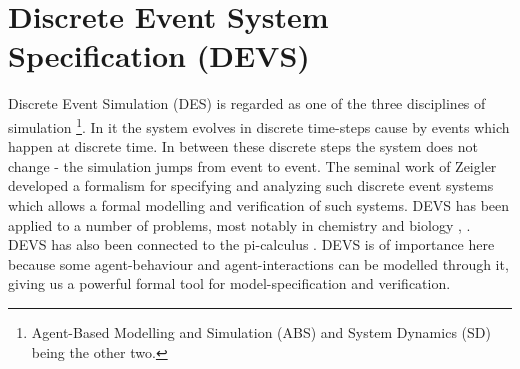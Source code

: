 \section{Discrete Event System Specification (DEVS)}
Discrete Event Simulation (DES) is regarded as one of the three disciplines of simulation \footnote{Agent-Based Modelling and Simulation (ABS) and System Dynamics (SD) being the other two.}. In it the system evolves in discrete time-steps cause by events which happen at discrete time. In between these discrete steps the system does not change - the simulation jumps from event to event. The seminal work of Zeigler \cite{zeigler_theory_2000} developed a formalism for specifying and analyzing such discrete event systems which allows a formal modelling and verification of such systems. DEVS has been applied to a number of problems, most notably in chemistry and biology \cite{ewald_discrete_2007}, \cite{uhrmacher_discrete_2005}. DEVS has also been connected to the pi-calculus \cite{wang_pi-calculus_2008}.
DEVS is of importance here because some agent-behaviour and agent-interactions can be modelled through it, giving us a powerful formal tool for model-specification and verification.